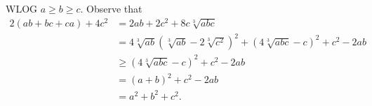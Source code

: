 WLOG $a\geq b\geq c$. Observe that
\begin{align*}
	2\left(ab+bc+ca\right)+4c^2&=2ab+2c^2+8c\sqrt[3]{abc}\\
	&=4\sqrt[3]{ab}\left(\sqrt[3]{ab}-2\sqrt[3]{c^2}\right)^2+\left(4\sqrt[3]{abc}-c\right)^2+c^2-2ab\\
	&\geq\left(4\sqrt[3]{abc}-c\right)^2+c^2-2ab\\
	&=\left(a+b\right)^2+c^2-2ab\\
	&=a^2+b^2+c^2.
\end{align*}